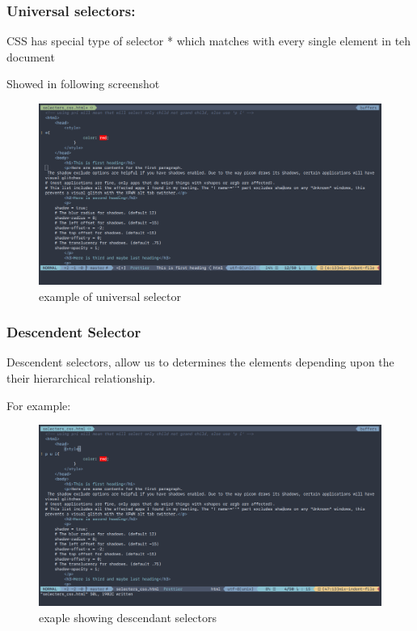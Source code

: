 \documentclass[a4paper,1pt,oneside]{article}
\begin{document}
\subsubsection{Universal selectors:}
CSS has special type of selector * which matches with every single element in teh document

Showed in following screenshot

\begin{figure}[hbt!]
	\centering
	\includegraphics[width=1\textwidth]{images/2020-03-23-225436_1302x688_scrot.png}
	\caption{example of universal selector}
\end{figure}

\subsubsection{Descendent Selector}
Descendent selectors, allow us to determines the elements depending upon the their hierarchical relationship.

For example:

\begin{figure}[hbt!]
	\centering
	\includegraphics[width=1\textwidth]{images/2020-03-23-225534_1302x688_scrot.png}
	\caption{exaple showing descendant selectors}
\end{figure}
\end{document}
